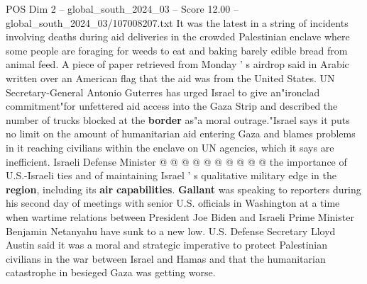 \begin{textsample}{POS Dim 2 – global\_south\_2024\_03 – Score 12.00 – global\_south\_2024\_03/107008207.txt}
It was the latest in a string of incidents involving deaths during aid deliveries in the crowded Palestinian enclave where some people are foraging for weeds to eat and baking barely edible bread from animal feed.
A piece of paper retrieved from Monday ' s airdrop said in Arabic written over an American flag that the aid was from the United States.
UN Secretary-General Antonio Guterres has urged Israel to give an"ironclad commitment"for unfettered aid access into the Gaza Strip and described the number of trucks blocked at the \textbf{border} as"a moral outrage."Israel says it puts no limit on the amount of humanitarian aid entering Gaza and blames problems in it reaching civilians within the enclave on UN agencies, which it says are inefficient.
Israeli Defense Minister @ @ @ @ @ @ @ @ @ @ the importance of U.S.-Israeli ties and of maintaining Israel ' s qualitative military edge in the \textbf{region}, including its \textbf{air} \textbf{capabilities}. \textbf{Gallant} was speaking to reporters during his second day of meetings with senior U.S. officials in Washington at a time when wartime relations between President Joe Biden and Israeli Prime Minister Benjamin Netanyahu have sunk to a new low.
U.S.
Defense Secretary Lloyd Austin said it was a moral and strategic imperative to protect Palestinian civilians in the war between Israel and Hamas and that the humanitarian catastrophe in besieged Gaza was getting worse.

\end{textsample}
